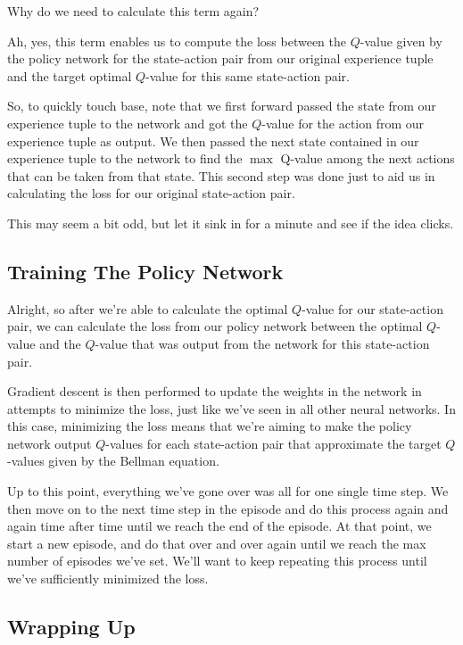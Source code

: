 Why do we need to calculate this term again?

Ah, yes, this term enables us to compute the loss between the $Q$-value given by the 
policy network for the state-action pair from our original experience tuple and the target 
optimal $Q$-value for this same state-action pair.

So, to quickly touch base, note that we first forward passed the state from our experience 
tuple to the network and got the $Q$-value for the action from our experience tuple as 
output. We then passed the next state contained in our experience tuple to the network to 
find the $\max$ Q-value among the next actions that can be taken from that state. This 
second step was done just to aid us in calculating the loss for our original state-action 
pair.

This may seem a bit odd, but let it sink in for a minute and see if the idea clicks.


\subsection{Training The Policy Network}

Alright, so after we're able to calculate the optimal $Q$-value for our state-action pair, 
we can calculate the loss from our policy network between the optimal $Q$-value and the 
$Q$-value that was output from the network for this state-action pair.

Gradient descent is then performed to update the weights in the network in attempts to 
minimize the loss, just like we've seen in all other neural networks. In this case, 
minimizing the loss means that we're aiming to make the policy network output $Q$-values 
for each state-action pair that approximate the target $Q$-values given by the Bellman 
equation.

Up to this point, everything we've gone over was all for one single time step. We then 
move on to the next time step in the episode and do this process again and again time 
after time until we reach the end of the episode. At that point, we start a new episode, 
and do that over and over again until we reach the max number of episodes we've set. We'll 
want to keep repeating this process until we've sufficiently minimized the loss.


\subsection{Wrapping Up}

